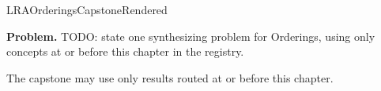 \ifcsname LRAOrderingsCapstoneRendered\endcsname
\else
\expandafter\gdef\csname LRAOrderingsCapstoneRendered\endcsname{}

\newpage
{}
\label{cap:orderings}

\begin{tcolorbox}[
  colback=gray!6,
  colframe=gray!40,
  arc=2pt,
  left=8pt, right=8pt, top=6pt, bottom=6pt,
  title={\small\textbf{Capstone Problem}},
  fonttitle=\small\bfseries
]
\textbf{Problem.}
TODO: state one synthesizing problem for Orderings, using only concepts at or
before this chapter in the registry.
\end{tcolorbox}

\begin{remark*}
The capstone may use only results routed at or before this chapter.
\end{remark*}

\clearpage
\fi
